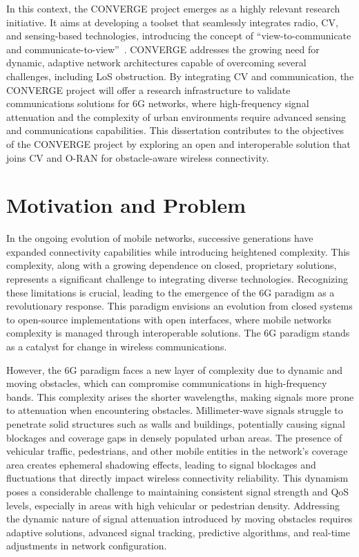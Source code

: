 In this context, the CONVERGE project emerges as a highly relevant research initiative.
It aims at developing a toolset that seamlessly integrates radio, CV, and sensing-based technologies, introducing the concept of “view-to-communicate and communicate-to-view”~\cite{converge_site}.
CONVERGE addresses the growing need for dynamic, adaptive network architectures capable of overcoming several challenges, including LoS obstruction.
By integrating CV and communication, the CONVERGE project will offer a research infrastructure to validate communications solutions for 6G networks, where high-frequency signal attenuation and the complexity of urban environments require advanced sensing and communications capabilities.
This dissertation contributes to the objectives of the CONVERGE project by exploring an open and interoperable solution that joins CV and O-RAN for obstacle-aware wireless connectivity.

\section{Motivation and Problem}\label{sec:motivation-and-problem}

In the ongoing evolution of mobile networks, successive generations have expanded connectivity capabilities while introducing heightened complexity.
This complexity, along with a growing dependence on closed, proprietary solutions, represents a significant challenge to integrating diverse technologies.
Recognizing these limitations is crucial, leading to the emergence of the 6G paradigm as a revolutionary response.
This paradigm envisions an evolution from closed systems to open-source implementations with open interfaces, where mobile networks complexity is managed through interoperable solutions.
The 6G paradigm stands as a catalyst for change in wireless communications.

However, the 6G paradigm faces a new layer of complexity due to dynamic and moving obstacles,  which can compromise communications in high-frequency bands.
This complexity arises the shorter wavelengths, making signals more prone to attenuation when encountering obstacles.
Millimeter-wave signals struggle to penetrate solid structures such as walls and buildings, potentially causing signal blockages and coverage gaps in densely populated urban areas.
The presence of vehicular traffic, pedestrians, and other mobile entities in the network's coverage area creates ephemeral shadowing effects, leading to signal blockages and fluctuations that directly impact wireless connectivity reliability.
This dynamism poses a considerable challenge to maintaining consistent signal strength and QoS levels, especially in areas with high vehicular or pedestrian density.
Addressing the dynamic nature of signal attenuation introduced by moving obstacles requires adaptive solutions, advanced signal tracking, predictive algorithms, and real-time adjustments in network configuration.

